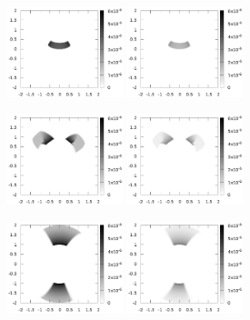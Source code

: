 \documentclass{article}
\begin{document}
\begin{figure}
	\centering
	\includegraphics[width=0.3\textwidth]{map-2Ha3accr453045}
	\includegraphics[width=0.3\textwidth]{map-2Hb3accr453045}
	
	\includegraphics[width=0.3\textwidth]{map-1Ha3accr453045}
	\includegraphics[width=0.3\textwidth]{map-1Hb3accr453045}
	
	\includegraphics[width=0.3\textwidth]{map0Ha3accr453045}
	\includegraphics[width=0.3\textwidth]{map0Hb3accr453045}
	

\end{figure}
\end{document}
